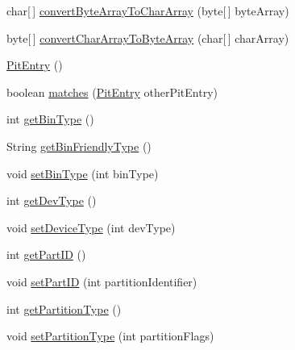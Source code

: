 \begin{DoxyCompactItemize}
\item 
char\mbox{[}$\,$\mbox{]} \hyperlink{class_c_a_s_u_a_l_1_1archiving_1_1libpit_1_1_pit_entry_a1bd37b3058a9be2b40c288d23aefbf73}{convert\-Byte\-Array\-To\-Char\-Array} (byte\mbox{[}$\,$\mbox{]} byte\-Array)
\item 
byte\mbox{[}$\,$\mbox{]} \hyperlink{class_c_a_s_u_a_l_1_1archiving_1_1libpit_1_1_pit_entry_a905bd7899229d0c728e5a41d17eccd6e}{convert\-Char\-Array\-To\-Byte\-Array} (char\mbox{[}$\,$\mbox{]} char\-Array)
\item 
\hyperlink{class_c_a_s_u_a_l_1_1archiving_1_1libpit_1_1_pit_entry_a7dce9e238989b4c981768ea6c08ba56f}{Pit\-Entry} ()
\item 
boolean \hyperlink{class_c_a_s_u_a_l_1_1archiving_1_1libpit_1_1_pit_entry_a455c8c036ed50b32dbe97a51d63752aa}{matches} (\hyperlink{class_c_a_s_u_a_l_1_1archiving_1_1libpit_1_1_pit_entry}{Pit\-Entry} other\-Pit\-Entry)
\item 
int \hyperlink{class_c_a_s_u_a_l_1_1archiving_1_1libpit_1_1_pit_entry_a9c7cef6888b381fb5d5f39897ee8fa01}{get\-Bin\-Type} ()
\item 
String \hyperlink{class_c_a_s_u_a_l_1_1archiving_1_1libpit_1_1_pit_entry_a4c05687648451db18c7ce8a1462d18ea}{get\-Bin\-Friendly\-Type} ()
\item 
void \hyperlink{class_c_a_s_u_a_l_1_1archiving_1_1libpit_1_1_pit_entry_a77819d3aab0cb6b70e44b12d36797a46}{set\-Bin\-Type} (int bin\-Type)
\item 
int \hyperlink{class_c_a_s_u_a_l_1_1archiving_1_1libpit_1_1_pit_entry_a13406ab3d6569e82b987e286d356c3de}{get\-Dev\-Type} ()
\item 
void \hyperlink{class_c_a_s_u_a_l_1_1archiving_1_1libpit_1_1_pit_entry_a18143ffa6de82880e2b40d435f5936f5}{set\-Device\-Type} (int dev\-Type)
\item 
int \hyperlink{class_c_a_s_u_a_l_1_1archiving_1_1libpit_1_1_pit_entry_a1074e70a4d163f899275f49e83d06caa}{get\-Part\-I\-D} ()
\item 
void \hyperlink{class_c_a_s_u_a_l_1_1archiving_1_1libpit_1_1_pit_entry_a34f52910a0f2033816b50a7c42cf221f}{set\-Part\-I\-D} (int partition\-Identifier)
\item 
int \hyperlink{class_c_a_s_u_a_l_1_1archiving_1_1libpit_1_1_pit_entry_a9c260192a5028ffee6496590d5a773be}{get\-Partition\-Type} ()
\item 
void \hyperlink{class_c_a_s_u_a_l_1_1archiving_1_1libpit_1_1_pit_entry_a6ef40cf9deab75de8c83086b38578353}{set\-Partition\-Type} (int partition\-Flags)
\item 

\end{DoxyCompactItemize}
